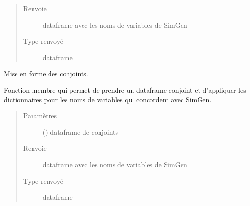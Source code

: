 \documentclass[letterpaper,10pt,french]{sphinxmanual}
\begin{document}
\begin{fulllineitems}
\begin{fulllineitems}
\begin{quote}
\begin{description}
\item[{Renvoie}] \leavevmode
dataframe avec les noms de variables de SimGen

\item[{Type renvoyé}] \leavevmode
dataframe

\end{description}\end{quote}

\end{fulllineitems}


\begin{fulllineitems}
\label{\detokenize{code:simgen.parse.spouses}}
Mise en forme des conjoints.

Fonction membre qui permet de prendre un dataframe conjoint et d’appliquer les dictionnaires  pour les noms de variables qui concordent avec SimGen.
\begin{quote}\begin{description}
\item[{Paramètres}] \leavevmode
{} () \textendash{} dataframe de conjoints

\item[{Renvoie}] \leavevmode
dataframe avec les noms de variables de SimGen

\item[{Type renvoyé}] \leavevmode
dataframe

\end{description}\end{quote}

\end{fulllineitems}


\end{fulllineitems}

\end{document}
